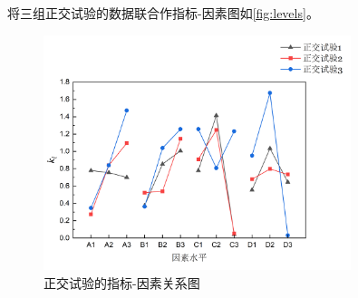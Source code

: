 将三组正交试验的数据联合作指标-因素图如\autoref{fig:levels}。

\begin{figure}[H]
    \centering
    \includegraphics[width = 0.8\textwidth]{figure/Some Pictures/figure-4.png}
    \caption{正交试验的指标-因素关系图}
    \label{fig:levels}
\end{figure}




